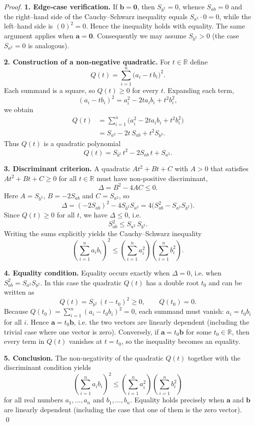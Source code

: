 \begin{proof}
\textbf{1. Edge‑case verification.}  
If $\mathbf b=\mathbf 0$, then $S_{b^{2}}=0$, whence $S_{ab}=0$ and the right–hand side of the Cauchy–Schwarz inequality equals $S_{a^{2}}\cdot0=0$, while the left–hand side is $(0)^{2}=0$. Hence the inequality holds with equality. The same argument applies when $\mathbf a=\mathbf 0$. Consequently we may assume $S_{b^{2}}>0$ (the case $S_{a^{2}}=0$ is analogous).

\medskip
\textbf{2. Construction of a non‑negative quadratic.}  
For $t\in\mathbb R$ define
\[
Q(t)=\sum_{i=1}^{n}\bigl(a_{i}-t\,b_{i}\bigr)^{2}.
\]
Each summand is a square, so $Q(t)\ge0$ for every $t$. Expanding each term,
\[
(a_i-t b_i)^2=a_i^{2}-2t a_i b_i+t^{2}b_i^{2},
\]
we obtain
\begin{align*}
Q(t)&=\sum_{i=1}^{n}\bigl(a_i^{2}-2t a_i b_i+t^{2}b_i^{2}\bigr)\\
    &=S_{a^{2}}-2t\,S_{ab}+t^{2}S_{b^{2}}.
\end{align*}
Thus $Q(t)$ is a quadratic polynomial
\[
Q(t)=S_{b^{2}}\,t^{2}-2S_{ab}\,t+S_{a^{2}}.
\]

\medskip
\textbf{3. Discriminant criterion.}  
A quadratic $At^{2}+Bt+C$ with $A>0$ that satisfies $At^{2}+Bt+C\ge0$ for all $t\in\mathbb R$ must have non‑positive discriminant,
\[
\Delta = B^{2}-4AC\le0.
\]
Here $A=S_{b^{2}}$, $B=-2S_{ab}$ and $C=S_{a^{2}}$, so
\[
\Delta =(-2S_{ab})^{2}-4S_{b^{2}}S_{a^{2}}
        =4\bigl(S_{ab}^{2}-S_{a^{2}}S_{b^{2}}\bigr).
\]
Since $Q(t)\ge0$ for all $t$, we have $\Delta\le0$, i.e.
\[
S_{ab}^{2}\le S_{a^{2}}\,S_{b^{2}}.
\]
Writing the sums explicitly yields the Cauchy–Schwarz inequality
\[
\left(\sum_{i=1}^{n}a_{i}b_{i}\right)^{2}
\le\left(\sum_{i=1}^{n}a_{i}^{2}\right)
   \left(\sum_{i=1}^{n}b_{i}^{2}\right).
\]

\medskip
\textbf{4. Equality condition.}  
Equality occurs exactly when $\Delta=0$, i.e. when $S_{ab}^{2}=S_{a^{2}}S_{b^{2}}$. In this case the quadratic $Q(t)$ has a double root $t_{0}$ and can be written as
\[
Q(t)=S_{b^{2}}\,(t-t_{0})^{2}\ge0,\qquad Q(t_{0})=0.
\]
Because $Q(t_{0})=\sum_{i=1}^{n}(a_{i}-t_{0}b_{i})^{2}=0$, each summand must vanish:
$a_{i}=t_{0}b_{i}$ for all $i$. Hence $\mathbf a = t_{0}\mathbf b$, i.e. the two vectors are linearly dependent (including the trivial case where one vector is zero). Conversely, if $\mathbf a = t_{0}\mathbf b$ for some $t_{0}\in\mathbb R$, then every term in $Q(t)$ vanishes at $t=t_{0}$, so the inequality becomes an equality.

\medskip
\textbf{5. Conclusion.}  
The non‑negativity of the quadratic $Q(t)$ together with the discriminant condition yields
\[
\boxed{\displaystyle
\left(\sum_{i=1}^{n}a_{i}b_{i}\right)^{2}
\le\left(\sum_{i=1}^{n}a_{i}^{2}\right)
   \left(\sum_{i=1}^{n}b_{i}^{2}\right)}
\]
for all real numbers $a_{1},\dots ,a_{n}$ and $b_{1},\dots ,b_{n}$. Equality holds precisely when $\mathbf a$ and $\mathbf b$ are linearly dependent (including the case that one of them is the zero vector). \qed
\end{proof}